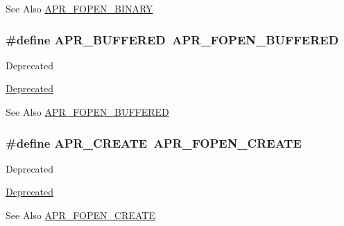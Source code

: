 \begin{DoxySeeAlso}{See Also}
\hyperlink{group__apr__file__open__flags_gacb20b3028864f34cb26314fe2cacc3fa}{A\-P\-R\-\_\-\-F\-O\-P\-E\-N\-\_\-\-B\-I\-N\-A\-R\-Y} 
\end{DoxySeeAlso}
\hypertarget{group__apr__file__open__flags_ga6edc818199e8b90e3dabf97c42a27158}{
\subsubsection[{A\-P\-R\-\_\-\-B\-U\-F\-F\-E\-R\-E\-D}]{\setlength{\rightskip}{0pt plus 5cm}\#define A\-P\-R\-\_\-\-B\-U\-F\-F\-E\-R\-E\-D~{\bf A\-P\-R\-\_\-\-F\-O\-P\-E\-N\-\_\-\-B\-U\-F\-F\-E\-R\-E\-D}}}\label{group__apr__file__open__flags_ga6edc818199e8b90e3dabf97c42a27158}
\begin{DoxyRefDesc}{Deprecated}
\item[\hyperlink{deprecated__deprecated000024}{Deprecated}]\end{DoxyRefDesc}
\begin{DoxySeeAlso}{See Also}
\hyperlink{group__apr__file__open__flags_gac48fd4c853c9f561632a2e8aaf5d8d97}{A\-P\-R\-\_\-\-F\-O\-P\-E\-N\-\_\-\-B\-U\-F\-F\-E\-R\-E\-D} 
\end{DoxySeeAlso}
\hypertarget{group__apr__file__open__flags_gac210e96bc821dbaa83c326e775dad028}{
\subsubsection[{A\-P\-R\-\_\-\-C\-R\-E\-A\-T\-E}]{\setlength{\rightskip}{0pt plus 5cm}\#define A\-P\-R\-\_\-\-C\-R\-E\-A\-T\-E~{\bf A\-P\-R\-\_\-\-F\-O\-P\-E\-N\-\_\-\-C\-R\-E\-A\-T\-E}}}\label{group__apr__file__open__flags_gac210e96bc821dbaa83c326e775dad028}
\begin{DoxyRefDesc}{Deprecated}
\item[\hyperlink{deprecated__deprecated000019}{Deprecated}]\end{DoxyRefDesc}
\begin{DoxySeeAlso}{See Also}
\hyperlink{group__apr__file__open__flags_gafe94f21ccbf411172e70e7f473af251a}{A\-P\-R\-\_\-\-F\-O\-P\-E\-N\-\_\-\-C\-R\-E\-A\-T\-E} 
\end{DoxySeeAlso}
